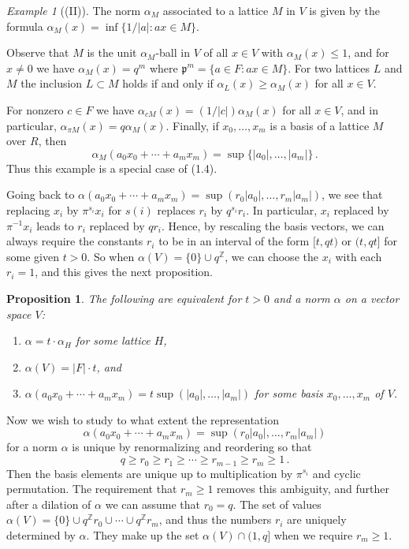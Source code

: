 \documentclass[12pt,a4paper]{article}
\theoremstyle{plain}
\newtheorem{proposition}{Proposition}[section]
\theoremstyle{definition}
\theoremstyle{remark}
\newtheorem{example}{Example}[section]
\begin{document}
\begin{example}[(II)]
The norm $\alpha_M$ associated to a lattice $M$ in $V$ is given by the formula 
$\alpha_M(x) = \inf\{1/|a| : ax \in M\}$.

Observe that $M$ is the unit $\alpha_M$-ball in $V$ of all $x \in V$ with 
$\alpha_M(x) \leqslant 1$, and for $x \neq 0$ we have $\alpha_M(x) = q^m$ where 
$\mathfrak{p}^m = \{a \in F : ax \in M\}$. For two lattices $L$ and $M$ the 
inclusion $L \subset M$ holds if and only if $\alpha_L(x) \geqslant \alpha_M(x)$ 
for all $x \in V$.

For nonzero $c \in F$ we have $\alpha_{cM}(x) = (1/|c|)\alpha_M(x)$ for all 
$x \in V$, and in particular, $\alpha_{\pi M}(x) = q\alpha_M(x)$. Finally, if 
$x_0, \ldots, x_m$ is a basis of a lattice $M$ over $R$, then
\[
\alpha_M(a_0 x_0 + \cdots + a_m x_m) = \sup\{|a_0|, \ldots, |a_m|\} \,.
\]
Thus this example is a special case of (1.4).
\end{example}

Going back to $\alpha(a_0 x_0 + \cdots + a_m x_m) = \sup(r_0|a_0|, \ldots, r_m|a_m|)$, 
we see that replacing $x_i$ by $\pi^{s_i}x_i$ for $s(i)$ replaces $r_i$ by 
$q^{s_i}r_i$. In particular, $x_i$ replaced by $\pi^{-1}x_i$ leads to $r_i$ 
replaced by $qr_i$. Hence, by rescaling the basis vectors, we can always 
require the constants $r_i$ to be in an interval of the form $[t, qt)$ or 
$(t, qt]$ for some given $t > 0$. So when $\alpha(V) = \{0\} \cup q^\mathbb{Z}$, 
we can choose the $x_i$ with each $r_i = 1$, and this gives the next 
proposition.

\begin{proposition}
The following are equivalent for $t > 0$ and a norm $\alpha$ on a vector 
space $V$:
\begin{enumerate}[label=(\arabic*)]
\item $\alpha = t \cdot \alpha_H$ for some lattice $H$,
\item $\alpha(V) = |F| \cdot t$, and
\item $\alpha(a_0 x_0 + \cdots + a_m x_m) = t\sup(|a_0|, \ldots, |a_m|)$ for some 
basis $x_0, \ldots, x_m$ of $V$.
\end{enumerate}
\end{proposition}

Now we wish to study to what extent the representation
\[
\alpha(a_0 x_0 + \cdots + a_m x_m) = \sup(r_0|a_0|, \ldots, r_m|a_m|)
\]
for a norm $\alpha$ is unique by renormalizing and reordering so that
\[
q \geqslant r_0 \geqslant r_1 \geqslant \cdots \geqslant r_{m-1} \geqslant r_m \geqslant 1 \,.
\]
Then the basis elements are unique up to multiplication by $\pi^{s_i}$ and 
cyclic permutation. The requirement that $r_m \geqslant 1$ removes this 
ambiguity, and further after a dilation of $\alpha$ we can assume that 
$r_0 = q$. The set of values $\alpha(V) = \{0\} \cup q^{\mathbb{Z}}r_0 \cup \cdots \cup q^{\mathbb{Z}}r_m$, 
and thus the numbers $r_i$ are uniquely determined by $\alpha$. They make up 
the set $\alpha(V) \cap (1,q]$ when we require $r_m \geqslant 1$.
\end{document}
